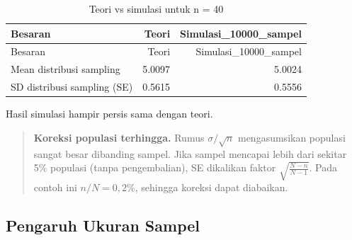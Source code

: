\documentclass[
  indonesian,
  letterpaper,
]{book}
\begin{document}
\begin{longtable}[]{@{}lrr@{}}
\caption{Teori vs simulasi untuk n = 40}\tabularnewline
\toprule\noalign{}
Besaran & Teori & Simulasi\_10000\_sampel \\
\midrule\noalign{}
\endfirsthead
\toprule\noalign{}
Besaran & Teori & Simulasi\_10000\_sampel \\
\midrule\noalign{}
\endhead
\bottomrule\noalign{}
\endlastfoot
Mean distribusi sampling & 5.0097 & 5.0024 \\
SD distribusi sampling (SE) & 0.5615 & 0.5556 \\
\end{longtable}

Hasil simulasi hampir persis sama dengan teori.

\begin{quote}
\textbf{Koreksi populasi terhingga.} Rumus \(\sigma/\sqrt{n}\)
mengasumsikan populasi sangat besar dibanding sampel. Jika sampel
mencapai lebih dari sekitar 5\% populasi (tanpa pengembalian), SE
dikalikan faktor \(\sqrt{\frac{N-n}{N-1}}\). Pada contoh ini
\(n/N = 0{,}2\%\), sehingga koreksi dapat diabaikan.
\end{quote}

\subsection{Pengaruh Ukuran Sampel}\label{pengaruh-ukuran-sampel}
\end{document}
